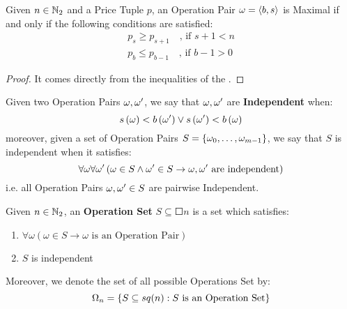 \begin{theorem}
    \label{theorem:max-op-pair}
    Given $n \in \mathbb{N}_{2}$ and a Price Tuple $p$, an Operation Pair $\omega = \left\langle b, s \right\rangle$ is Maximal if and only if the following conditions are satisfied:
    \begin{align}
        p_s \geqslant p_{s+1} \quad \mbox{, if } s+1 < n\\
        p_b \leqslant p_{b-1} \quad \mbox{, if } b-1 > 0
    \end{align}
\end{theorem}

\begin{proof}
    It comes directly from the inequalities of the .
\end{proof}

\begin{defn}
    Given two Operation Pairs $\omega, \omega'$, we say that $\omega, \omega'$ are \textbf{Independent} when:
    \begin{equation}
        s\left( \omega \right) < b\left( \omega' \right) \lor s\left( \omega' \right) < b\left( \omega \right)
    \end{equation}
    moreover, given a set of Operation Pairs $S = \left\{ \omega_0, \dots, \omega_{m-1} \right\}$, we say that $S$ is independent when it satisfies:
    \begin{equation}
        \forall \omega \forall \omega' \left(
            \omega \in S \land \omega' \in S
            \rightarrow
            \omega, \omega' \mbox{ are independent}
        \right)
    \end{equation}
    i.e. all Operation Pairs $\omega, \omega' \in S$ are pairwise Independent.
\end{defn}

\begin{defn}
    Given $n \in \mathbb{N}_{2}$, an \textbf{Operation Set} $S \subseteq \Square{n}$ is a set which satisfies:
    \begin{enumerate}
        \item $\forall \omega \left( \omega \in S \rightarrow \omega \mbox{ is an Operation Pair} \right)$
        \item $S$ is independent
    \end{enumerate}
    Moreover, we denote the set of all possible Operations Set by:
    \begin{equation}
        \Omega_{n} = \left\{  S \subseteq sq({n}) : S \mbox{ is an Operation Set} \right\}
    \end{equation}
\end{defn}

